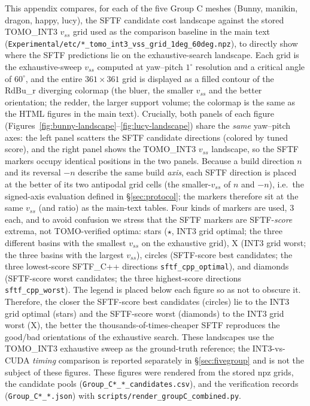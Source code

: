 \documentclass[11pt,a4paper]{article}
\begin{document}
This appendix compares, for each of the five Group C meshes (Bunny, manikin, dragon, happy, lucy), the SFTF candidate cost landscape against the stored TOMO\_INT3 $v_{ss}$ grid used as the comparison baseline in the main text
(\texttt{Experimental/etc/*\_tomo\_int3\_vss\_grid\_1deg\_60deg.npz}),
to directly show where the SFTF predictions lie on the exhaustive-search landscape.
Each grid is the exhaustive-sweep $v_{ss}$ computed at yaw--pitch $1^\circ$ resolution and a critical angle of $60^\circ$,
and the entire $361\times361$ grid is displayed as a filled contour of the RdBu\_r diverging colormap
(the bluer, the smaller $v_{ss}$ and the better orientation; the redder, the larger support volume; the colormap is the same as the HTML figures in the main text).
Crucially, both panels of each figure (Figures~\ref{fig:bunny-landscape}--\ref{fig:lucy-landscape}) share the \emph{same} yaw--pitch axes:
the left panel scatters the SFTF candidate directions (colored by tuned score), and the right panel shows the TOMO\_INT3 $v_{ss}$ landscape,
so the SFTF markers occupy identical positions in the two panels.
Because a build direction $n$ and its reversal $-n$ describe the same build \emph{axis}, each SFTF direction is placed at the better of its two antipodal grid cells
(the smaller-$v_{ss}$ of $n$ and $-n$), i.e.\ the signed-axis evaluation defined in \S\ref{sec:protocol}; the markers therefore sit at the same $v_{ss}$ (and ratio) as the main-text tables.
Four kinds of markers are used, 3 each, and to avoid confusion we stress that the SFTF markers are SFTF-\emph{score} extrema, not TOMO-verified optima:
stars ($\star$, INT3 grid optimal; the three different basins with the smallest $v_{ss}$ on the exhaustive grid),
X (INT3 grid worst; the three basins with the largest $v_{ss}$), circles (SFTF-score best candidates; the three lowest-score SFTF\_C++ directions \texttt{sftf\_cpp\_optimal}),
and diamonds (SFTF-score worst candidates; the three highest-score directions \texttt{sftf\_cpp\_worst}).
The legend is placed below each figure so as not to obscure it.
Therefore, the closer the SFTF-score best candidates (circles) lie to the INT3 grid optimal (stars) and the SFTF-score worst (diamonds) to the INT3 grid worst (X),
the better the thousands-of-times-cheaper SFTF reproduces the good/bad orientations of the exhaustive search.
These landscapes use the TOMO\_INT3 exhaustive sweep as the ground-truth reference; the INT3-vs-CUDA \emph{timing} comparison is reported separately in \S\ref{sec:fivegroup} and is not the subject of these figures.
These figures were rendered from the stored npz grids, the candidate pools (\texttt{Group\_C*\_*\_candidates.csv}), and the verification records (\texttt{Group\_C*\_*.json})
with \texttt{scripts/render\_groupC\_combined.py}.
\end{document}
